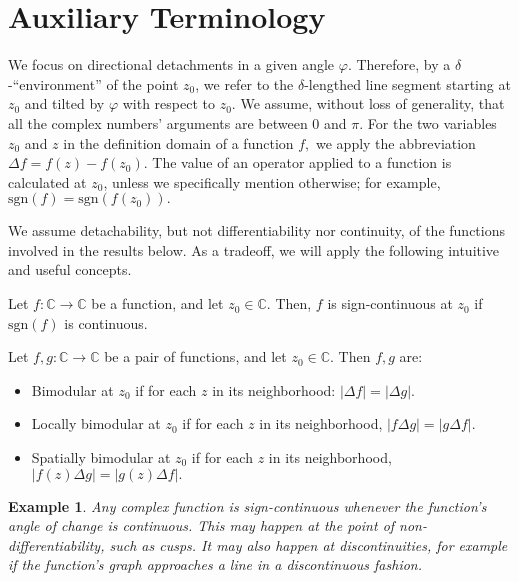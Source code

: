 \documentclass[11pt]{book}
\newtheorem{exm}[thm]{Example}
\begin{document}
\section{Auxiliary Terminology}

We focus on directional detachments in a given angle $\varphi.$ Therefore, by a $\delta$-“environment” of the point $z_{0}$, we refer to the $\delta$-lengthed line segment starting at $z_{0}$ and tilted by $\varphi$ with respect to $z_{0}.$
We assume, without loss of generality, that all the complex numbers' arguments are between $0$ and $\pi.$
For the two variables $z_{0}$ and $z$ in the definition domain of a function $f,$ we apply the abbreviation $\Delta f=f\left(z\right)-f\left(z_{0}\right).$
The value of an operator applied to a function is calculated at $z_{0}$, unless we specifically mention otherwise; for example, $\text{sgn}\left(f\right)=\text{sgn}\left(f\left(z_{0}\right)\right).$

We assume detachability, but not differentiability nor continuity, of the functions involved in the results below. As a tradeoff, we will apply the following intuitive and useful concepts.

\begin{definition}
Let $f:\mathbb{C}\longrightarrow\mathbb{C}$ be a function, and let $z_{0}\in\mathbb{C}.$ Then, $f$ is sign-continuous at $z_{0}$ if $\text{sgn}\left(f\right)$ is continuous.
\end{definition}

\begin{definition}[Bimodularity]
Let $f,g:\mathbb{C}\longrightarrow\mathbb{C}$ be a pair of functions, and let $z_{0}\in\mathbb{C}.$ Then $f,g$ are:

\begin{itemize}
\item Bimodular at $z_{0}$ if for each $z$ in its neighborhood: $\left|\Delta f\right|=\left|\Delta g\right|.$
\item Locally bimodular at $z_{0}$ if for each $z$ in its neighborhood, $\left|f\Delta g\right|=\left|g\Delta f\right|.$
\item Spatially bimodular at $z_{0} $ if for each $z$ in its neighborhood, $\left|f\left(z\right)\Delta g\right|=\left|g\left(z\right)\Delta f\right|.$
\end{itemize}
\end{definition}

\begin{exm}Any complex function is sign-continuous whenever the function's angle of change is continuous. This may happen at the point of non-differentiability, such as cusps. It may also happen at discontinuities, for example if the function's graph approaches a line in a discontinuous fashion.
\end{exm}
\end{document}
